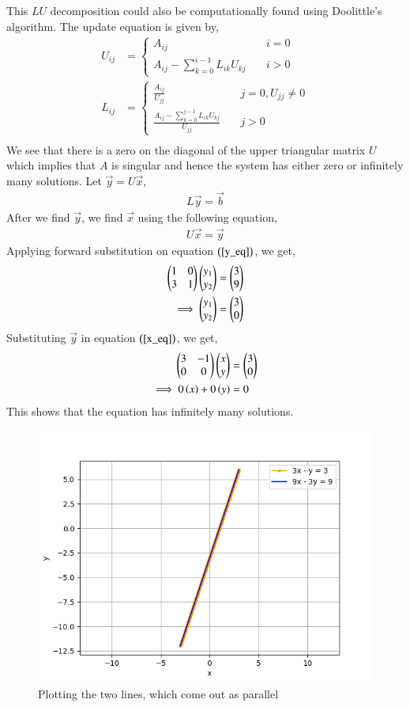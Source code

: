\documentclass[journal]{IEEEtran}
\begin{document}
This $LU$ decomposition could also be computationally found using Doolittle's algorithm. The update equation is given by,
\begin{align}
    U_{ij} &= \begin{cases}
        A_{ij} & \quad i = 0\\
        A_{ij} - \sum_{k = 0}^{i - 1} L_{ik} U_{kj} & \quad i > 0
    \end{cases}\\
    L_{ij} &= \begin{cases}
        \frac{A_{ij}}{U_{jj}} & \quad j = 0, U_{jj} \neq 0\\
        \frac{A_{ij} - \sum_{k = 0}^{j - 1} L_{ik} U_{kj}}{U_{jj}} & \quad j > 0
    \end{cases}\\
\end{align}
We see that there is a zero on the diagonal of the upper triangular matrix $U$ which implies that $A$ is singular and hence the system has either zero or infinitely many solutions.
\newline
Let $\vec{y} = U\vec{x}$,
\begin{align}
    L\vec{y} = \vec{b} \label{y_eq}
\end{align}
After we find $\vec{y}$, we find $\vec{x}$ using the following equation,
\begin{align}
    U\vec{x} = \vec{y} \label{x_eq}
\end{align}
Applying forward substitution on equation $\left(\ref{y_eq}\right)$, we get,
\begin{align}
    \begin{pmatrix}1 & 0\\3 & 1\end{pmatrix}\begin{pmatrix}y_1\\y_2\end{pmatrix} &= \begin{pmatrix}3\\9\end{pmatrix}\\
    \implies \begin{pmatrix}y_1\\y_2\end{pmatrix} &= \begin{pmatrix}3\\0\end{pmatrix}
\end{align}
Substituting $\vec{y}$ in equation $\left(\ref{x_eq}\right)$, we get,
\begin{align}
    \begin{pmatrix}3 & -1\\0 & 0\end{pmatrix} \begin{pmatrix}x\\y\end{pmatrix} &= \begin{pmatrix}3\\0\end{pmatrix}\\
    \implies 0\left(x\right) + 0\left(y\right) &= 0
\end{align}
This shows that the equation has infinitely many solutions.
\begin{figure}[h!]
  \centering
  \includegraphics[width=0.7\columnwidth]{figs/graph.png}
  \caption{Plotting the two lines, which come out as parallel}
  \label{label}
\end{figure}
\end{document}
